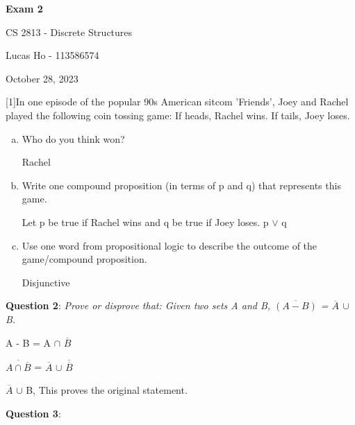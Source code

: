 \documentclass{article} %
\newcommand{\question}[2][]{\begin{flushleft}
        \textbf{Question #1}: \textit{#2}

\end{flushleft}}
\newcommand{\maketitletwo}[2][]{\begin{center}
        \Large{\textbf{Exam 2}
            
            CS 2813 - Discrete Structures} %
        \vspace{5pt}
        
        \normalsize{Lucas Ho - 113586574  %
        
        October 28, 2023}        %
        \vspace{15pt}
        
\end{center}}
\begin{document}
    \maketitletwo[5]  %
    
    \question[1]{In one episode of the popular 90s American sitcom ’Friends’, Joey and Rachel
    played the following coin tossing game: If heads, Rachel wins. If tails, Joey loses.}

    \begin{enumerate}[(a)]
      \item {Who do you think won?}
      
      Rachel
      \item {Write one compound proposition (in terms of p and q) that represents this game.}
      
      Let p be true if Rachel wins and q be true if Joey loses. p $\lor$ q
      \item {Use one word from propositional logic to describe the outcome of the game/compound proposition.}
      
      Disjunctive
      
    \end{enumerate}

    \question[2]{Prove or disprove that: Given two sets A and B, $\overline{(A - B)}$ = $\overline{A}$ $\cup$ B.}

    A - B = A $\cap$ $\overline{B}$

    $\overline{A \cap \overline{B}}$ = $\overline{A}$ $\cup$ $\overline{\overline{B}}$

    $\overline{A}$ $\cup$ B, This proves the original statement.

    \question[3]{}
\end{document}
